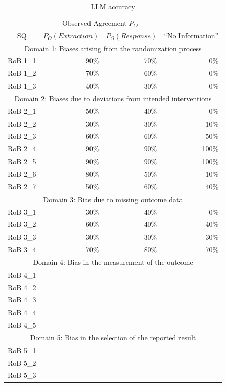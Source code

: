 \documentclass[sn-mathphys,Numbered]{sn-jnl}%
\theoremstyle{thmstyleone}%
\theoremstyle{thmstyletwo}%
\theoremstyle{thmstylethree}%
\begin{document}
\begin{table}[htb]
    \caption{LLM accuracy}
    \label{table:LLM_eval}
    \centering
    \begin{tabular}{crrr}
    \toprule[1.0pt]
     & \multicolumn{2}{c}{Observed Agreement $P_{O}$} \\
        SQ & $P_{O} (Extraction)$ & $P_{O} (Response)$ & ``No Information'' \\ 
    \midrule[1.0pt]
        \multicolumn{4}{c}{Domain 1: Biases arising from the randomization process} \\
        \hline
        RoB 1\_1 & 90\% & 70\% & 0\% \\ 
        RoB 1\_2 & 70\% & 60\% & 0\% \\ 
        RoB 1\_3 & 40\% & 30\% & 0\% \\ 
        \hline
        \multicolumn{4}{c}{Domain 2: Biases due to deviations from intended interventions} \\
        \hline
        RoB 2\_1 & 50\% & 40\% & 0\% \\
        RoB 2\_2 & 30\% & 30\% & 10\% \\ 
        RoB 2\_3 & 60\% & 60\% & 50\% \\ 
        RoB 2\_4 & 90\% & 90\% & 100\% \\ 
        RoB 2\_5 & 90\% & 90\% & 100\% \\ 
        RoB 2\_6 & 80\% & 50\% & 10\% \\ 
        RoB 2\_7 & 50\% & 60\% & 40\% \\
        \hline
        \multicolumn{4}{c}{Domain 3: Bias due to missing outcome data} \\
        \hline
        RoB 3\_1 & 30\% & 40\% & 0\% \\ 
        RoB 3\_2 & 60\% & 40\% & 40\% \\ 
        RoB 3\_3 & 30\% & 30\% & 30\% \\ 
        RoB 3\_4 & 70\% & 80\% & 70\% \\ 
        \hline
        \multicolumn{4}{c}{Domain 4: Bias in the measurement of the outcome} \\
        \hline
        RoB 4\_1 & & & \\ 
        RoB 4\_2 & & & \\ 
        RoB 4\_3 & & & \\ 
        RoB 4\_4 & & & \\ 
        RoB 4\_5 & & & \\ 
        \hline
        \multicolumn{4}{c}{Domain 5: Bias in the selection of the reported result} \\
        \hline
        RoB 5\_1 & & & \\ 
        RoB 5\_2 & & & \\ 
        RoB 5\_3 & & & \\
    \bottomrule[1.0pt]
    \end{tabular}
\end{table}
%
%
%
\end{document}
